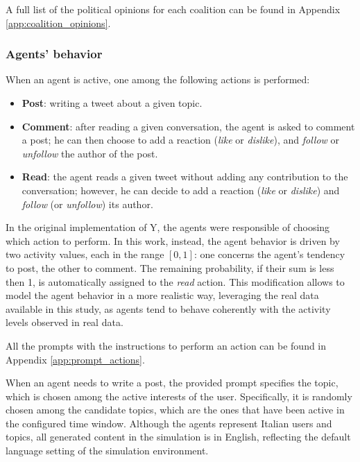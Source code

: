 

A full list of the political opinions for each coalition can be found in Appendix \ref{app:coalition_opinions}.



\subsubsection{Agents' behavior}
When an agent is active, one among the following actions is performed:
\begin{itemize}
    \item \textbf{Post}: writing a tweet about a given topic.
    \item \textbf{Comment}: after reading a given conversation, the agent is asked to comment a post; he can then choose to add a reaction (\textit{like} or \textit{dislike}), and \textit{follow} or \textit{unfollow} the author of the post.
    \item \textbf{Read}: the agent reads a given tweet without adding any contribution to the conversation; however, he can decide to add a reaction (\textit{like} or \textit{dislike}) and \textit{follow} (or \textit{unfollow}) its author.
\end{itemize}

\medskip
In the original implementation of Y, the agents were responsible of choosing which action to perform.
In this work, instead, the agent behavior is driven by two activity values, each in the range $[0,1]$: one concerns the agent's tendency to post, the other to comment. 
The remaining probability, if their sum is less then 1, is automatically assigned to the \textit{read} action.
This modification allows to model the agent behavior in a more realistic way, leveraging the real data available in this study, as agents tend to behave coherently with the activity levels observed in real data.

All the prompts with the instructions to perform an action can be found in Appendix \ref{app:prompt_actions}.

When an agent needs to write a post, the provided prompt specifies the topic, which is chosen among the active interests of the user.
Specifically, it is randomly chosen among the candidate topics, which are the ones that have been active in the configured time window.
Although the agents represent Italian users and topics, all generated content in the simulation is in English, reflecting the default language setting of the simulation environment.

